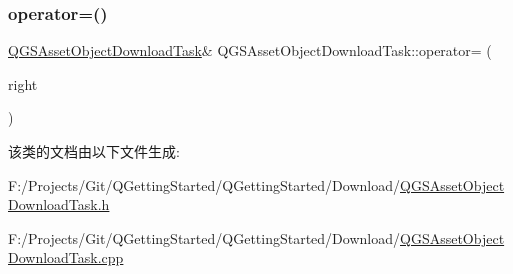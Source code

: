 \subsubsection{\texorpdfstring{operator=()}{operator=()}\hspace{0.1cm}{\footnotesize\ttfamily [2/2]}}
{\footnotesize\ttfamily \mbox{\hyperlink{class_q_g_s_asset_object_download_task}{Q\+G\+S\+Asset\+Object\+Download\+Task}}\& Q\+G\+S\+Asset\+Object\+Download\+Task\+::operator= (\begin{DoxyParamCaption}\item[{\mbox{\hyperlink{class_q_g_s_asset_object_download_task}{Q\+G\+S\+Asset\+Object\+Download\+Task}} \&\&}]{right }\end{DoxyParamCaption})\hspace{0.3cm}{\ttfamily [delete]}}



该类的文档由以下文件生成\+:\begin{DoxyCompactItemize}
\item 
F\+:/\+Projects/\+Git/\+Q\+Getting\+Started/\+Q\+Getting\+Started/\+Download/\mbox{\hyperlink{_q_g_s_asset_object_download_task_8h}{Q\+G\+S\+Asset\+Object\+Download\+Task.\+h}}\item 
F\+:/\+Projects/\+Git/\+Q\+Getting\+Started/\+Q\+Getting\+Started/\+Download/\mbox{\hyperlink{_q_g_s_asset_object_download_task_8cpp}{Q\+G\+S\+Asset\+Object\+Download\+Task.\+cpp}}\end{DoxyCompactItemize}
